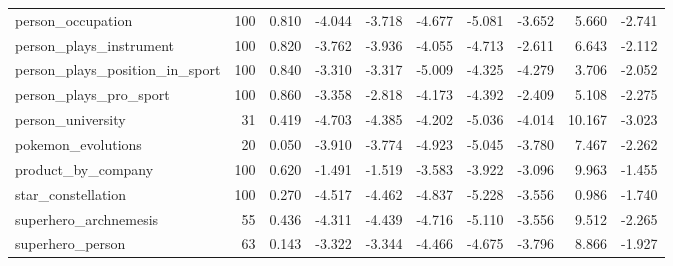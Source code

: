 \begin{table}[htbp]
{\begin{tabular}{lrrrrrrrrr}
person\_occupation & 100 & 0.810 & -4.044 & -3.718 & -4.677 & -5.081 & -3.652 & 5.660 & -2.741 \\
person\_plays\_instrument & 100 & 0.820 & -3.762 & -3.936 & -4.055 & -4.713 & -2.611 & 6.643 & -2.112 \\
person\_plays\_position\_in\_sport & 100 & 0.840 & -3.310 & -3.317 & -5.009 & -4.325 & -4.279 & 3.706 & -2.052 \\
person\_plays\_pro\_sport & 100 & 0.860 & -3.358 & -2.818 & -4.173 & -4.392 & -2.409 & 5.108 & -2.275 \\
person\_university & 31 & 0.419 & -4.703 & -4.385 & -4.202 & -5.036 & -4.014 & 10.167 & -3.023 \\
pokemon\_evolutions & 20 & 0.050 & -3.910 & -3.774 & -4.923 & -5.045 & -3.780 & 7.467 & -2.262 \\
product\_by\_company & 100 & 0.620 & -1.491 & -1.519 & -3.583 & -3.922 & -3.096 & 9.963 & -1.455 \\
star\_constellation & 100 & 0.270 & -4.517 & -4.462 & -4.837 & -5.228 & -3.556 & 0.986 & -1.740 \\
superhero\_archnemesis & 55 & 0.436 & -4.311 & -4.439 & -4.716 & -5.110 & -3.556 & 9.512 & -2.265 \\
superhero\_person & 63 & 0.143 & -3.322 & -3.344 & -4.466 & -4.675 & -3.796 & 8.866 & -1.927 \\
\bottomrule
\end{tabular}}
\end{table}
